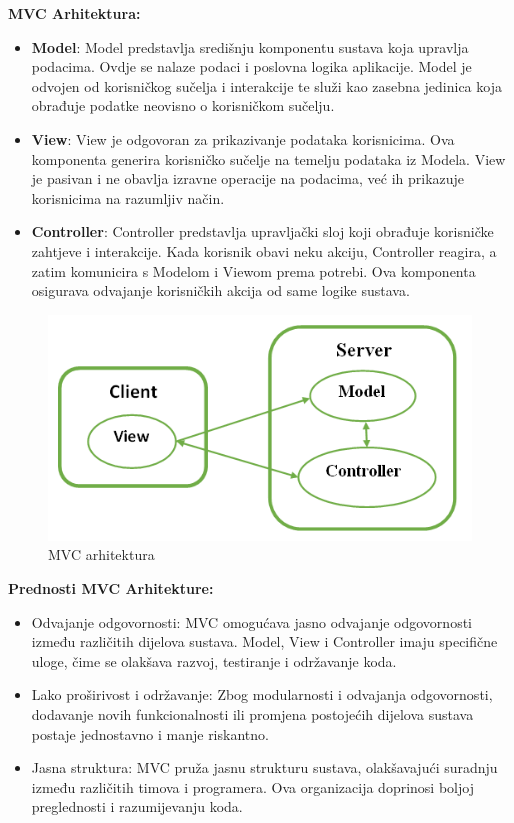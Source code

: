 \textbf{MVC Arhitektura:}

\begin{itemize}
    \item \textbf{Model}: Model predstavlja središnju komponentu sustava koja upravlja podacima. Ovdje se nalaze podaci i poslovna logika aplikacije. Model je odvojen od korisničkog sučelja i interakcije te služi kao zasebna jedinica koja obrađuje podatke neovisno o korisničkom sučelju.
    \item \textbf{View}: View je odgovoran za prikazivanje podataka korisnicima. Ova komponenta generira korisničko sučelje na temelju podataka iz Modela. View je pasivan i ne obavlja izravne operacije na podacima, već ih prikazuje korisnicima na razumljiv način.
    \item \textbf{Controller}: Controller predstavlja upravljački sloj koji obrađuje korisničke zahtjeve i interakcije. Kada korisnik obavi neku akciju, Controller reagira, a zatim komunicira s Modelom i Viewom prema potrebi. Ova komponenta osigurava odvajanje korisničkih akcija od same logike sustava.

\end{itemize}
\begin{figure}[h]
    \centering
    \includegraphics[width=0.5\linewidth]{slike/mvc2.png}
    \caption{MVC arhitektura}
    \label{fig:enter-label}
\end{figure}
 \textbf{
\newline Prednosti MVC Arhitekture:}
\begin{itemize}
    \item Odvajanje odgovornosti: MVC omogućava jasno odvajanje odgovornosti između različitih dijelova sustava. Model, View i Controller imaju specifične uloge, čime se olakšava razvoj, testiranje i održavanje koda.
    \item Lako proširivost i održavanje: Zbog modularnosti i odvajanja odgovornosti, dodavanje novih funkcionalnosti ili promjena postojećih dijelova sustava postaje jednostavno i manje riskantno.
    \item Jasna struktura: MVC pruža jasnu strukturu sustava, olakšavajući suradnju između različitih timova i programera. Ova organizacija doprinosi boljoj preglednosti i razumijevanju koda.
\end{itemize}

